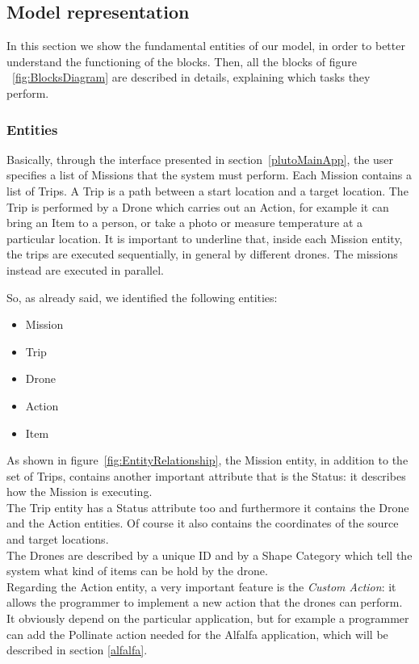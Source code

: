 \newpage
\subsection{Model representation}
\label{modelRepresentation}

In this section we show the fundamental entities of our model, in order to better understand the functioning of the blocks.
Then, all the blocks of figure ~\ref{fig:BlocksDiagram} are described in details, explaining which tasks they perform.

\subsubsection{Entities}\label{entities}

Basically, through the interface presented in section~\ref{plutoMainApp}, the user specifies a list of Missions that the system must perform.
Each Mission contains a list of Trips.
A Trip is a path between a start location and a target location.
The Trip is performed by a Drone which carries out an Action, for example it can bring an Item to a person, or take a photo or measure temperature at a particular location.
It is important to underline that, inside each Mission entity, the trips are executed sequentially, in general by different drones.
The missions instead are executed in parallel.


So, as already said, we identified the following entities:

\begin{itemize}
\itemsep2pt
\item{
Mission
}
\item{
Trip
}
\item{
Drone
}
\item{
Action
}
\item{
Item
}
\end{itemize}


As shown in figure~\ref{fig:EntityRelationship}, the Mission entity, in addition to the set of Trips, contains another important attribute that is the Status: it describes how the Mission is executing.
\\
The Trip entity has a Status attribute too and furthermore it contains the Drone and the Action entities.
Of course it also contains the coordinates of the source and target locations.
\\
The Drones are described by a unique ID and by a Shape Category which tell the system what kind of items can be hold by the drone.
\\
Regarding the Action entity, a very important feature is the \textit{Custom Action}: it allows the programmer to implement a new action that the drones can perform.
It obviously depend on the particular application, but for example a programmer can add the Pollinate action needed for the Alfalfa application\cite{alfalfa}, which will be described in section \ref{alfalfa}.


